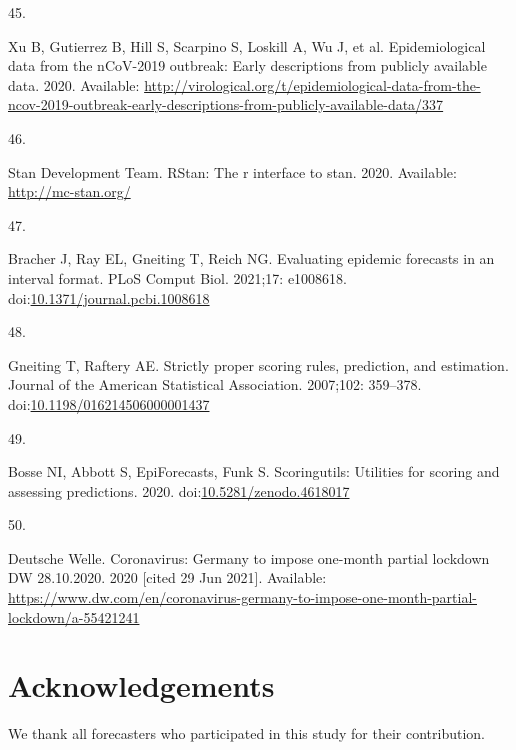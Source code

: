 \documentclass[10pt,letterpaper]{article}
\newlength{\cslhangindent}
\newlength{\csllabelwidth}
\newlength{\cslentryspacingunit} %
\newenvironment{CSLReferences}[2] %
 {%
  \setlength{\parindent}{0pt}
  \ifodd #1
  \let\oldpar\par
  \def\par{\hangindent=\cslhangindent\oldpar}
  \fi
  \setlength{\parskip}{#2\cslentryspacingunit}
 }%
 {}
\newcommand{\CSLLeftMargin}[1]{\parbox[t]{\csllabelwidth}{#1}}
\newcommand{\CSLRightInline}[1]{\parbox[t]{\linewidth - \csllabelwidth}{#1}\break}
\begin{document}
\begin{CSLReferences}{0}{0}
\leavevmode{}%
\CSLLeftMargin{45. }%
\CSLRightInline{Xu B, Gutierrez B, Hill S, Scarpino S, Loskill A, Wu J,
et al. Epidemiological data from the nCoV-2019 outbreak: Early
descriptions from publicly available data. 2020. Available:
\url{http://virological.org/t/epidemiological-data-from-the-ncov-2019-outbreak-early-descriptions-from-publicly-available-data/337}}

\leavevmode{}%
\CSLLeftMargin{46. }%
\CSLRightInline{Stan Development Team. RStan: The r interface to stan.
2020. Available: \url{http://mc-stan.org/}}

\leavevmode{}%
\CSLLeftMargin{47. }%
\CSLRightInline{Bracher J, Ray EL, Gneiting T, Reich NG. Evaluating
epidemic forecasts in an interval format. PLoS Comput Biol. 2021;17:
e1008618.
doi:\href{https://doi.org/10.1371/journal.pcbi.1008618}{10.1371/journal.pcbi.1008618}}

\leavevmode{}%
\CSLLeftMargin{48. }%
\CSLRightInline{Gneiting T, Raftery AE. Strictly proper scoring rules,
prediction, and estimation. Journal of the American Statistical
Association. 2007;102: 359--378.
doi:\href{https://doi.org/10.1198/016214506000001437}{10.1198/016214506000001437}}

\leavevmode{}%
\CSLLeftMargin{49. }%
\CSLRightInline{Bosse NI, Abbott S, EpiForecasts, Funk S. Scoringutils:
Utilities for scoring and assessing predictions. 2020.
doi:\href{https://doi.org/10.5281/zenodo.4618017}{10.5281/zenodo.4618017}}

\leavevmode{}%
\CSLLeftMargin{50. }%
\CSLRightInline{Deutsche Welle. Coronavirus: {Germany} to impose
one-month partial lockdown \textbar{} {DW} \textbar{} 28.10.2020. 2020
{[}cited 29 Jun 2021{]}. Available:
\url{https://www.dw.com/en/coronavirus-germany-to-impose-one-month-partial-lockdown/a-55421241}}

\end{CSLReferences}

\clearpage

\section*{Acknowledgements}

We thank all forecasters who participated in this study for their
contribution.
\end{document}
